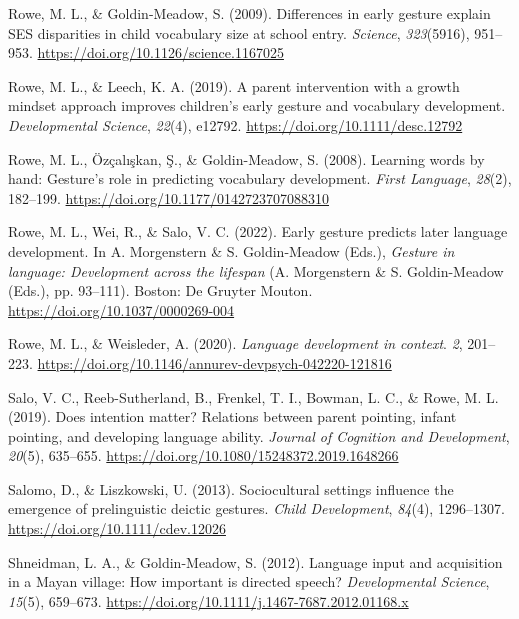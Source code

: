 \documentclass[
  man,mask,floatsintext]{apa6}
\newlength{\cslhangindent}
\newlength{\cslentryspacingunit} %
\newenvironment{CSLReferences}[2] %
 {%
  \setlength{\parindent}{0pt}
  \ifodd #1
  \let\oldpar\par
  \def\par{\hangindent=\cslhangindent\oldpar}
  \fi
  \setlength{\parskip}{#2\cslentryspacingunit}
 }%
 {}
\begin{document}
\begin{CSLReferences}{1}{0}
\leavevmode{}%
Rowe, M. L., \& Goldin-Meadow, S. (2009). Differences in early gesture explain {SES} disparities in child vocabulary size at school entry. \emph{Science}, \emph{323}(5916), 951--953. \url{https://doi.org/10.1126/science.1167025}

\leavevmode{}%
Rowe, M. L., \& Leech, K. A. (2019). A parent intervention with a growth mindset approach improves children's early gesture and vocabulary development. \emph{Developmental Science}, \emph{22}(4), e12792. \url{https://doi.org/10.1111/desc.12792}

\leavevmode{}%
Rowe, M. L., Özçalışkan, Ş., \& Goldin-Meadow, S. (2008). Learning words by hand: {Gesture}'s role in predicting vocabulary development. \emph{First Language}, \emph{28}(2), 182--199. \url{https://doi.org/10.1177/0142723707088310}

\leavevmode{}%
Rowe, M. L., Wei, R., \& Salo, V. C. (2022). Early gesture predicts later language development. In A. Morgenstern \& S. Goldin-Meadow (Eds.), \emph{Gesture in language: {Development} across the lifespan} (A. Morgenstern \& S. Goldin-Meadow (Eds.), pp. 93--111). Boston: De Gruyter Mouton. \url{https://doi.org/10.1037/0000269-004}

\leavevmode{}%
Rowe, M. L., \& Weisleder, A. (2020). \emph{Language development in context}. \emph{2}, 201--223. \url{https://doi.org/10.1146/annurev-devpsych-042220-121816}

\leavevmode{}%
Salo, V. C., Reeb-Sutherland, B., Frenkel, T. I., Bowman, L. C., \& Rowe, M. L. (2019). Does intention matter? {Relations} between parent pointing, infant pointing, and developing language ability. \emph{Journal of Cognition and Development}, \emph{20}(5), 635--655. \url{https://doi.org/10.1080/15248372.2019.1648266}

\leavevmode{}%
Salomo, D., \& Liszkowski, U. (2013). Sociocultural settings influence the emergence of prelinguistic deictic gestures. \emph{Child Development}, \emph{84}(4), 1296--1307. \url{https://doi.org/10.1111/cdev.12026}

\leavevmode{}%
Shneidman, L. A., \& Goldin-Meadow, S. (2012). Language input and acquisition in a {Mayan} village: {How} important is directed speech? \emph{Developmental Science}, \emph{15}(5), 659--673. \url{https://doi.org/10.1111/j.1467-7687.2012.01168.x}


\end{CSLReferences}
\end{document}
